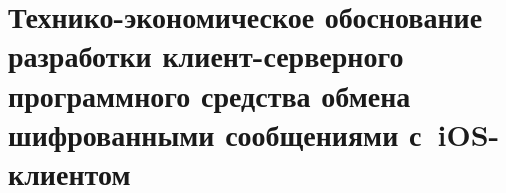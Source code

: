 \section{Технико-экономическое обоснование разработки клиент-серверного программного средства обмена шифрованными сообщениями с~iOS-клиентом}
\label{sec:economics}


